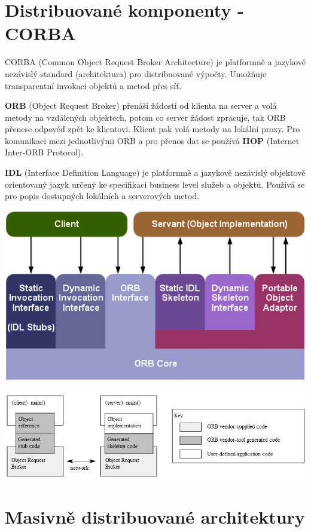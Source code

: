\documentclass{scrreprt}
\begin{document}
\section{Distribuované komponenty - CORBA}
CORBA (Common Object Request Broker Architecture) je platformně a jazykově nezávislý standard (architektura) pro distribuované výpočty. Umožňuje transparentní invokaci objektů a metod přes síť.

\textbf{ORB} (Object Request Broker) přenáší žádosti od klienta na server a volá metody na vzdálených objektech, potom co server žádost zpracuje, tak ORB přenese odpověď zpět ke klientovi. Klient pak volá metody na lokální proxy. Pro komunikaci mezi jednotlivými ORB a pro přenos dat se používá \textbf{IIOP} (Internet Inter-ORB Protocol).

\textbf{IDL} (Interface Definition Language) je platformně a jazykově nezávislý objektově orientovaný jazyk určený ke specifikaci business level služeb a objektů. Používá se pro popis dostupných lokálních a serverových metod.

\begin{center}
\includegraphics[scale=0.5]{img/corba}
\end{center}
\begin{center}
\includegraphics[scale=0.9]{img/orb}
\end{center}

\section{Masivně distribuované architektury}
\end{document}
